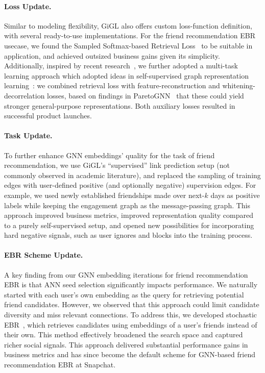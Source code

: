 \paragraph{Loss Update.} 
Similar to modeling flexibility, GiGL also offers custom loss-function definition, with several ready-to-use implementations.  For the friend recommendation EBR usecase, we found the Sampled Softmax-based Retrieval Loss~\citep{jean2014using,yi2019sampling,wu2024effectiveness} to be suitable in application, and achieved outsized business gains given its simplicity. Additionally, inspired by recent research~\citep{ju2022multi}, we further adopted a multi-task learning approach which adopted ideas in self-supervised graph representation learning~\cite{kolodner2024robust}: we combined retrieval loss with feature-reconstruction and whitening-decorrelation losses, based on findings in ParetoGNN~\citep{ju2022multi} that these could yield stronger general-purpose representations. Both auxiliary losses resulted in successful product launches.

\paragraph{Task Update.} 
To further enhance GNN embeddings' quality for the task of friend recommendation, we use GiGL's ``supervised'' link prediction setup (not commonly observed in academic literature), 
and replaced the sampling of training edges with user-defined positive (and optionally negative) supervision edges. For example, we used newly established friendships made over next-$k$ days as positive labels while keeping the engagement graph as the message-passing graph. This approach improved business metrics, improved representation quality compared to a purely self-supervised setup, and opened new possibilities for incorporating hard negative signals, such as user ignores and blocks into the training process.

\paragraph{EBR Scheme Update.} A key finding from our GNN embedding iterations for friend recommendation EBR is that ANN seed selection significantly impacts performance. 
We naturally started with each user's own embedding as the query for retrieving potential friend candidates. However, we observed that this approach could limit candidate diversity and miss relevant connections.
To address this,  we developed stochastic EBR~\citep{kung2024improving}, which retrieves candidates using embeddings of a user’s friends instead of their own. 
This method effectively broadened the search space and captured richer social signals.
This approach delivered substantial performance gains in business metrics and has since become the default scheme for GNN-based friend recommendation EBR at Snapchat.

